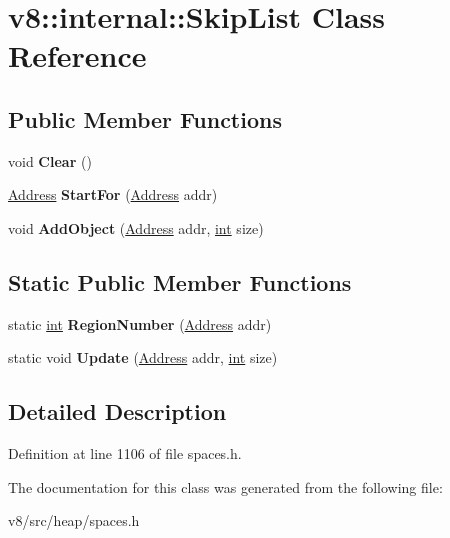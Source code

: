 \hypertarget{classv8_1_1internal_1_1SkipList}{}\section{v8\+:\+:internal\+:\+:Skip\+List Class Reference}
\label{classv8_1_1internal_1_1SkipList}
\subsection*{Public Member Functions}
\begin{DoxyCompactItemize}
\item 
\mbox{\label{classv8_1_1internal_1_1SkipList_aa7f250b2de572f5e46c9de704f0bf9e0}} 
void {\bfseries Clear} ()
\item 
\mbox{\label{classv8_1_1internal_1_1SkipList_a0387ed9e1fea8f3c470fca611259dfe5}} 
\mbox{\hyperlink{classuintptr__t}{Address}} {\bfseries Start\+For} (\mbox{\hyperlink{classuintptr__t}{Address}} addr)
\item 
\mbox{\label{classv8_1_1internal_1_1SkipList_a297e1c51c3d473727ae5748cf4b5536a}} 
void {\bfseries Add\+Object} (\mbox{\hyperlink{classuintptr__t}{Address}} addr, \mbox{\hyperlink{classint}{int}} size)
\end{DoxyCompactItemize}
\subsection*{Static Public Member Functions}
\begin{DoxyCompactItemize}
\item 
\mbox{\label{classv8_1_1internal_1_1SkipList_aac6fce51cc7637ea622e4d47bff619fa}} 
static \mbox{\hyperlink{classint}{int}} {\bfseries Region\+Number} (\mbox{\hyperlink{classuintptr__t}{Address}} addr)
\item 
\mbox{\label{classv8_1_1internal_1_1SkipList_a3be6172846582899cd94eb989bbe0d06}} 
static void {\bfseries Update} (\mbox{\hyperlink{classuintptr__t}{Address}} addr, \mbox{\hyperlink{classint}{int}} size)
\end{DoxyCompactItemize}


\subsection{Detailed Description}


Definition at line 1106 of file spaces.\+h.



The documentation for this class was generated from the following file\+:\begin{DoxyCompactItemize}
\item 
v8/src/heap/spaces.\+h\end{DoxyCompactItemize}
